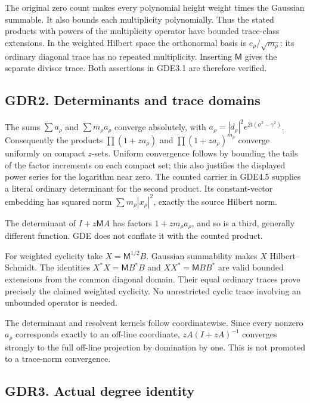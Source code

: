 The original zero count makes every polynomial height weight times the
Gaussian summable. It also bounds each multiplicity polynomially. Thus
the stated products with powers of the multiplicity operator have
bounded trace-class extensions. In the weighted Hilbert space the
orthonormal basis is \(e_\rho/\sqrt{m_\rho}\): its ordinary diagonal
trace has no repeated multiplicity. Inserting \(\mathsf M\) gives the
separate divisor trace. Both assertions in GDE3.1 are therefore
verified.

\subsection{GDR2. Determinants and trace
domains}\label{gdr2.-determinants-and-trace-domains}

The sums \(\sum a_\rho\) and \(\sum m_\rho a_\rho\) converge absolutely,
with \(a_\rho=|d_\rho|^2e^{2t(\sigma^2-\gamma^2)}\). Consequently the
products \(\prod(1+za_\rho)\) and \(\prod(1+za_\rho)^{m_\rho}\) converge
uniformly on compact \(z\)-sets. Uniform convergence follows by bounding
the tails of the factor increments on each compact set; this also
justifies the displayed power series for the logarithm near zero. The
counted carrier in GDE4.5 supplies a literal ordinary determinant for
the second product. Its constant-vector embedding has squared norm
\(\sum m_\rho|x_\rho|^2\), exactly the source Hilbert norm.

The determinant of \(I+z\mathsf M A\) has factors \(1+zm_\rho a_\rho\),
and so is a third, generally different function. GDE does not conflate
it with the counted product.

For weighted cyclicity take \(X=\mathsf M^{1/2}B\). Gaussian summability
makes \(X\) Hilbert--Schmidt. The identities \(X^*X=\mathsf M B^*B\) and
\(XX^*=\mathsf M BB^*\) are valid bounded extensions from the common
diagonal domain. Their equal ordinary traces prove precisely the claimed
weighted cyclicity. No unrestricted cyclic trace involving an unbounded
operator is needed.

The determinant and resolvent kernels follow coordinatewise. Since every
nonzero \(a_\rho\) corresponds exactly to an off-line coordinate,
\(zA(I+zA)^{-1}\) converges strongly to the full off-line projection by
domination by one. This is not promoted to a trace-norm convergence.

\subsection{GDR3. Actual degree
identity}\label{gdr3.-actual-degree-identity}

